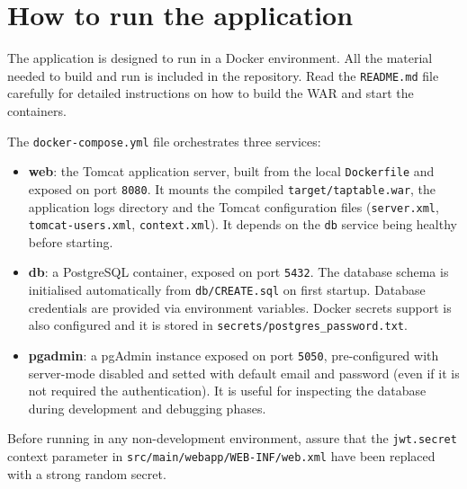 \section{How to run the application}
The application is designed to run in a Docker environment. All the material needed to build and run is included in the repository. Read the \texttt{README.md} file carefully for detailed instructions on how to build the WAR and start the containers.

The \texttt{docker-compose.yml} file orchestrates three services:
\begin{itemize}
    \item \textbf{web}: the Tomcat application server, built from the local \texttt{Dockerfile} and exposed on port \texttt{8080}. It mounts the compiled \texttt{target/taptable.war}, the application logs directory and the Tomcat configuration files (\texttt{server.xml}, \texttt{tomcat-users.xml}, \texttt{context.xml}). It depends on the \texttt{db} service being healthy before starting.
    
    \item \textbf{db}: a PostgreSQL container, exposed on port \texttt{5432}. The database schema is initialised automatically from \texttt{db/CREATE.sql} on first startup. Database credentials are provided via environment variables. Docker secrets support is also configured and it is stored in \texttt{secrets/postgres\_password.txt}.
    
    \item \textbf{pgadmin}: a pgAdmin instance exposed on port \texttt{5050}, pre-configured with server-mode disabled and setted with default email and password (even if it is not required the authentication). It is useful for inspecting the database during development and debugging phases.
\end{itemize}

Before running in any non-development environment, assure that the \texttt{jwt.secret} context parameter in \texttt{src/main/webapp/WEB-INF/web.xml} have been replaced with a strong random secret.